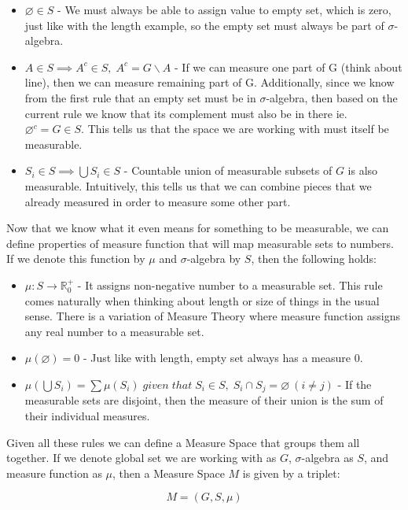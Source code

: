 \documentclass{article}
\begin{document}
\begin{itemize}
    \item $\varnothing \in S$ - We must always be able to assign value to empty set, which is zero, just like with the length example, so the empty set must always be part of $\sigma$-algebra.
    \item $A \in S \implies A^c \in S,\;A^c = G \backslash A$ - If we can measure one part of G (think about line), then we can measure remaining part of G. Additionally, since we know from the first rule that an empty set must be in $\sigma$-algebra, then based on the current rule we know that its complement must also be in there ie. $\varnothing^c = G \in S$. This tells us that the space we are working with must itself be measurable.
    \item $S_i \in S \implies \bigcup S_i \in S$ - Countable union of measurable subsets of $G$ is also measurable. Intuitively, this tells us that we can combine pieces that we already measured in order to measure some other part.
\end{itemize}

Now that we know what it even means for something to be measurable, we can define properties of measure function that will map measurable sets to numbers. If we denote this function by $\mu$ and $\sigma$-algebra by $S$, then the following holds:

\begin{itemize}
    \item $\mu: S \rightarrow \mathbb{R}_{0}^{+}$ - It assigns non-negative number to a measurable set. This rule comes naturally when thinking about length or size of things in the usual sense. There is a variation of Measure Theory where measure function assigns any real number to a measurable set.
    \item $\mu(\varnothing) = 0$ - Just like with length, empty set always has a measure 0.
    \item $\mu(\bigcup S_i) = \sum\mu(S_i)\;given\;that\; S_i \in S,\;S_i \cap S_j = \varnothing\:(i \neq j)$ - If the measurable sets are disjoint, then the measure of their union is the sum of their individual measures.
\end{itemize}

Given all these rules we can define a Measure Space that groups them all together. If we denote global set we are working with as $G$, $\sigma$-algebra as $S$, and measure function as $\mu$, then a Measure Space $M$ is given by a triplet:

\[ M = (G, S, \mu)\]
\end{document}
